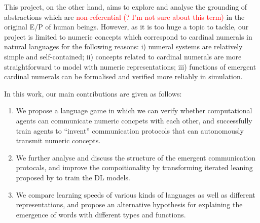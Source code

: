 This project, on the other hand, aims to explore and analyse the grounding of abstractions which are \textcolor{red}{non-referential (? I'm not sure about this term)} in the original E/P of human beings. However, as it is too huge a topic to tackle, our project is limited to numeric concepts which correspond to cardinal numerals in natural languages for the following reasons: i) numeral systems are relatively simple and self-contained\cite{james1999numeral}; ii) concepts related to cardinal numerals are more straightforward to model with numeric representations; iii) functions of emergent cardinal numerals can be formalised and verified more reliably in simulation.

In this work, our main contributions are given as follows:

\begin{enumerate}
  \item We propose a language game in which we can verify whether computational agents can communicate numeric concpets with each other, and successfully train agents to ``invent'' communication protocols that can autonomously transmit numeric concepts.
  \item We further analyse and discuss the structure of the emergent communication protocals, and improve the compoitionality by transforming iterated leaning proposed by \cite{smith2003iterated} to train the DL models.
  \item We compare learning speeds of various kinds of languages as well as different representations, and propose an alternative hypothesis for explaining the emergence of words with different types and functions.
\end{enumerate}
